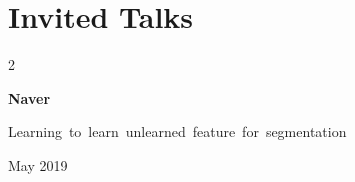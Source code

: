 \documentclass[10pt, letterpaper]{article}
\newenvironment{twocolentry}[2][]{
    \onecolentry
    \def\secondColumn{#2}
    \setcolumnwidth{\fill, 4.5 cm}
    \begin{paracol}{2}
}{
    \switchcolumn \raggedleft \secondColumn
    \end{paracol}
    \endonecolentry
} %
\begin{document}
    




    
    









    \section{Invited Talks}

        
        \begin{samepage}
            \begin{twocolentry}{
                May 2019
            }
                \textbf{Naver}

                \vspace{0.10 cm}

                \mbox{Learning to learn unlearned feature for segmentation}
                \vspace{0.10 cm}
            \end{twocolentry}
        \end{samepage}
\end{document}
